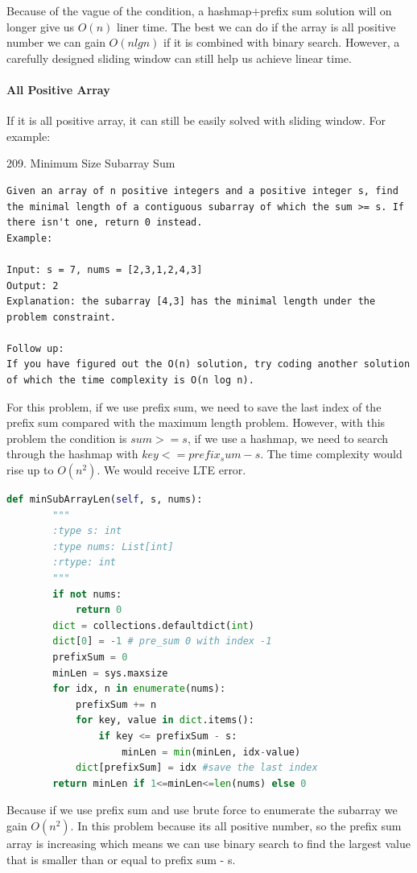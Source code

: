 \documentclass[../specific-algorithms.tex]{subfiles}
\begin{document}
Because of the vague of the condition, a hashmap$+$prefix sum solution will on longer give us $O(n)$ liner time. The best we can do if the array is all positive number we can gain $O(nlgn)$ if it is combined with binary search. However, a carefully designed sliding window can still help us achieve linear time. 

\paragraph{All Positive Array}

If it is all positive array, it can still be easily solved with sliding window. For example: 

209. Minimum Size Subarray Sum
\begin{lstlisting}
Given an array of n positive integers and a positive integer s, find the minimal length of a contiguous subarray of which the sum >= s. If there isn't one, return 0 instead.
Example: 

Input: s = 7, nums = [2,3,1,2,4,3]
Output: 2
Explanation: the subarray [4,3] has the minimal length under the problem constraint.

Follow up:
If you have figured out the O(n) solution, try coding another solution of which the time complexity is O(n log n). 
\end{lstlisting}
For this problem, if we use prefix sum, we need to save the last index of the prefix sum compared with the maximum length problem. However, with this problem the condition is $sum >= s$, if we use a hashmap, we need to search through the hashmap with $key <= prefix_sum - s$. The time complexity would rise up to $O(n^2)$. We would receive LTE error.
\begin{lstlisting}[language = Python]
    def minSubArrayLen(self, s, nums):
        """
        :type s: int
        :type nums: List[int]
        :rtype: int
        """
        if not nums:
            return 0
        dict = collections.defaultdict(int)
        dict[0] = -1 # pre_sum 0 with index -1
        prefixSum = 0
        minLen = sys.maxsize
        for idx, n in enumerate(nums):
            prefixSum += n
            for key, value in dict.items():
                if key <= prefixSum - s: 
                    minLen = min(minLen, idx-value)
            dict[prefixSum] = idx #save the last index
        return minLen if 1<=minLen<=len(nums) else 0
\end{lstlisting}
Because if we use prefix sum and use brute force to enumerate the subarray we gain $O(n^2)$. In this problem because its all positive number, so the prefix sum array is increasing which means we can use binary search to find the largest value that is smaller than or equal to prefix sum - s.
\end{document}
